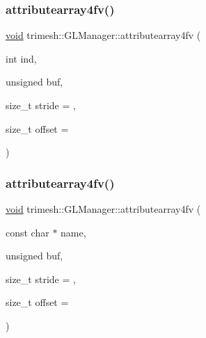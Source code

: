 \subsubsection{\texorpdfstring{attributearray4fv()}{attributearray4fv()}\hspace{0.1cm}{\footnotesize\ttfamily [5/6]}}
{\footnotesize\ttfamily \hyperlink{namespacetrimesh_a784ddfd979e1c579bda795a8edfc3f43}{void} trimesh\+::\+G\+L\+Manager\+::attributearray4fv (\begin{DoxyParamCaption}\item[{int}]{ind,  }\item[{unsigned}]{buf,  }\item[{size\+\_\+t}]{stride = {},  }\item[{size\+\_\+t}]{offset = {} }\end{DoxyParamCaption})\hspace{0.3cm}{\ttfamily [inline]}}

\mbox{\label{classtrimesh_1_1GLManager_af048fa094172473a9f8c150717cfc2f0}} 
\subsubsection{\texorpdfstring{attributearray4fv()}{attributearray4fv()}\hspace{0.1cm}{\footnotesize\ttfamily [6/6]}}
{\footnotesize\ttfamily \hyperlink{namespacetrimesh_a784ddfd979e1c579bda795a8edfc3f43}{void} trimesh\+::\+G\+L\+Manager\+::attributearray4fv (\begin{DoxyParamCaption}\item[{const char $\ast$}]{name,  }\item[{unsigned}]{buf,  }\item[{size\+\_\+t}]{stride = {},  }\item[{size\+\_\+t}]{offset = {} }\end{DoxyParamCaption})\hspace{0.3cm}{\ttfamily [inline]}}

\mbox{\label{classtrimesh_1_1GLManager_a708081b8afa4e053ab5845fe64b64f70}} 
